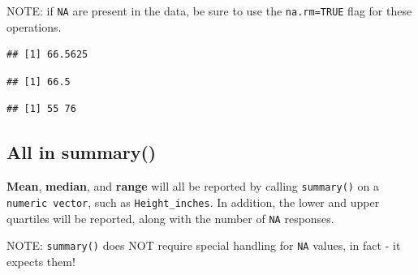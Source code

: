 \documentclass[
]{book}
\newenvironment{Shaded}{\begin{snugshade}}{\end{snugshade}}
\newcommand{\AttributeTok}[1]{\textcolor[rgb]{0.13,0.29,0.53}{#1}}
\newcommand{\FunctionTok}[1]{\textcolor[rgb]{0.13,0.29,0.53}{\textbf{#1}}}
\newcommand{\NormalTok}[1]{#1}
\newcommand{\SpecialCharTok}[1]{\textcolor[rgb]{0.81,0.36,0.00}{\textbf{#1}}}
\begin{document}
NOTE: if \texttt{NA} are present in the data, be sure to use the \texttt{na.rm=TRUE} flag for these operations.

\begin{Shaded}
\end{Shaded}

\begin{verbatim}
## [1] 66.5625
\end{verbatim}

\begin{Shaded}
\end{Shaded}

\begin{verbatim}
## [1] 66.5
\end{verbatim}

\begin{Shaded}
\end{Shaded}

\begin{verbatim}
## [1] 55 76
\end{verbatim}

\hypertarget{all-in-summary}{%
\subsection*{All in summary()}\label{all-in-summary}}

\textbf{Mean}, \textbf{median}, and \textbf{range} will all be reported by calling \texttt{summary()} on a \texttt{numeric\ vector}, such as \texttt{Height\_inches}. In addition, the lower and upper quartiles will be reported, along with the number of \texttt{NA} responses.

NOTE: \texttt{summary()} does NOT require special handling for \texttt{NA} values, in fact - it expects them!
\end{document}
